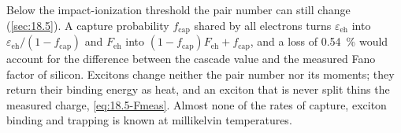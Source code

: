 Below the impact-ionization threshold the pair number can still change (\cref{sec:18.5}). A capture probability $f_{\mathrm{cap}}$ shared by all electrons turns $\varepsilon_{\mathrm{eh}}$ into $\varepsilon_{\mathrm{eh}}/(1 - f_{\mathrm{cap}})$ and $F_{\mathrm{eh}}$ into $(1 - f_{\mathrm{cap}})F_{\mathrm{eh}} + f_{\mathrm{cap}}$, and a loss of \SI{0.54}{\percent} would account for the difference between the cascade value and the measured Fano factor of silicon. Excitons change neither the pair number nor its moments; they return their binding energy as heat, and an exciton that is never split thins the measured charge, \cref{eq:18.5-Fmeas}. Almost none of the rates of capture, exciton binding and trapping is known at millikelvin temperatures.
